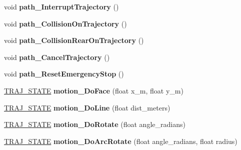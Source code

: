 \begin{DoxyCompactItemize}
\item 
\mbox{\label{classAsservDriver_affc4e315cdd03c826cea17114d02a19c}} 
void {\bfseries path\+\_\+\+Interrupt\+Trajectory} ()
\item 
\mbox{\label{classAsservDriver_a6af616f39706df060f1b81b2047c7a7f}} 
void {\bfseries path\+\_\+\+Collision\+On\+Trajectory} ()
\item 
\mbox{\label{classAsservDriver_a370b2f287b352211c07a023edcb63bc7}} 
void {\bfseries path\+\_\+\+Collision\+Rear\+On\+Trajectory} ()
\item 
\mbox{\label{classAsservDriver_a7f18af77a8524e09f8c9b024d4f0e4b8}} 
void {\bfseries path\+\_\+\+Cancel\+Trajectory} ()
\item 
\mbox{\label{classAsservDriver_aa54769b7bbe83fefa64925aa60089096}} 
void {\bfseries path\+\_\+\+Reset\+Emergency\+Stop} ()
\item 
\mbox{\label{classAsservDriver_a0e3dd8cd0074221327d049f522c35f1e}} 
\hyperlink{path__manager_8h_adb3360abeb29758da93865c8afcb80eb}{T\+R\+A\+J\+\_\+\+S\+T\+A\+TE} {\bfseries motion\+\_\+\+Do\+Face} (float x\+\_\+m, float y\+\_\+m)
\item 
\mbox{\label{classAsservDriver_a4ac101bd479baeecf76fd0d6be63421d}} 
\hyperlink{path__manager_8h_adb3360abeb29758da93865c8afcb80eb}{T\+R\+A\+J\+\_\+\+S\+T\+A\+TE} {\bfseries motion\+\_\+\+Do\+Line} (float dist\+\_\+meters)
\item 
\mbox{\label{classAsservDriver_aca1011c3fb10e594e836ea4ada6b92ff}} 
\hyperlink{path__manager_8h_adb3360abeb29758da93865c8afcb80eb}{T\+R\+A\+J\+\_\+\+S\+T\+A\+TE} {\bfseries motion\+\_\+\+Do\+Rotate} (float angle\+\_\+radians)
\item 
\mbox{\label{classAsservDriver_aabc36af66a38e2fb735e764730328994}} 
\hyperlink{path__manager_8h_adb3360abeb29758da93865c8afcb80eb}{T\+R\+A\+J\+\_\+\+S\+T\+A\+TE} {\bfseries motion\+\_\+\+Do\+Arc\+Rotate} (float angle\+\_\+radians, float radius)
\item 

\end{DoxyCompactItemize}
